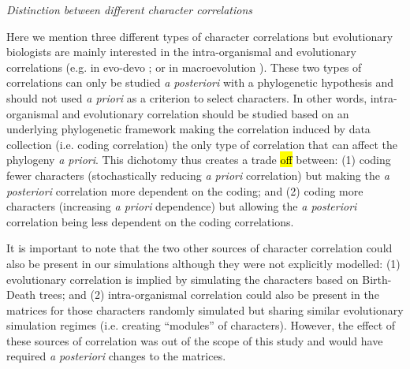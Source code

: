 \documentclass[12pt,letterpaper]{article}
\renewcommand{\subsection}[1]{%
\bigskip
\begin{center}
\begin{large}
\normalfont\itshape #1
\end{large}
\end{center}}
\begin{document}
\subsection{Distinction between different character correlations}
Here we mention three different types of character correlations but evolutionary biologists are mainly interested in the intra-organismal and evolutionary correlations (e.g. in evo-devo \citealt{goswami2006morphological}; or in macroevolution \citealt{fitzjohn2014much}).
These two types of correlations can only be studied \textit{a posteriori} with a phylogenetic hypothesis and should not used \textit{a priori} as a criterion to select characters.
In other words, intra-organismal and evolutionary correlation should be studied based on an underlying phylogenetic framework making the correlation induced by data collection (i.e. coding correlation) the only type of correlation that can affect the phylogeny \textit{a priori}.
This dichotomy thus creates a trade \hl{off} between: (1) coding fewer characters (stochastically reducing \textit{a priori} correlation) but making the \textit{a posteriori} correlation more dependent on the coding;
and (2) coding more characters (increasing \textit{a priori} dependence) but allowing the \textit{a posteriori} correlation being less dependent on the coding correlations.

It is important to note that the two other sources of character correlation could also be present in our simulations although they were not explicitly modelled:
(1) evolutionary correlation is implied by simulating the characters based on Birth-Death trees;
and (2) intra-organismal correlation could also be present in the matrices for those characters randomly simulated but sharing similar evolutionary simulation regimes (i.e. creating ``modules'' of characters).
However, the effect of these sources of correlation was out of the scope of this study and would have required \textit{a posteriori} changes to the matrices.%
\end{document}
